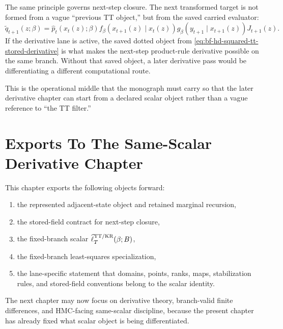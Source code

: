 The same principle governs next-step closure.  The next transformed target is not
formed from a vague “previous TT object,” but from the saved carried evaluator:
\begin{equation}
  \widetilde q_{t+1}(z;\beta)=
  \widehat p_t(x_t(z);\beta)
  f_\beta(x_{t+1}(z)\mid x_t(z))
  g_\beta(y_{t+1}\mid x_{t+1}(z))J_{t+1}(z).
  \label{eq:bf-hd-squared-tt-next-target}
\end{equation}
If the derivative lane is active, the saved dotted object from
\eqref{eq:bf-hd-squared-tt-stored-derivative} is what makes the next-step
product-rule derivative possible on the same branch.  Without that saved object,
a later derivative pass would be differentiating a different computational route.

This is the operational middle that the monograph must carry so that the later
derivative chapter can start from a declared scalar object rather than a vague
reference to “the TT filter.”

\section{Exports To The Same-Scalar Derivative Chapter}
\label{sec:bf-hd-squared-tt-exports}

This chapter exports the following objects forward:
\begin{enumerate}[leftmargin=0.28in]
  \item the represented adjacent-state object and retained marginal recursion,
  \item the stored-field contract for next-step closure,
  \item the fixed-branch scalar \(\widehat\ell_T^{\rm TT/KR}(\beta;B)\),
  \item the fixed-branch least-squares specialization,
  \item the lane-specific statement that domains, points, ranks, maps,
  stabilization rules, and stored-field conventions belong to the scalar identity.
\end{enumerate}
The next chapter may now focus on derivative theory, branch-valid finite
differences, and HMC-facing same-scalar discipline, because the present chapter
has already fixed what scalar object is being differentiated.
